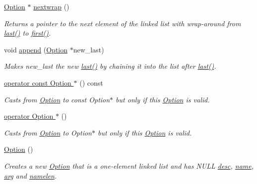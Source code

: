 \begin{DoxyCompactItemize}
\hyperlink{classoption_1_1Option}{Option} $\ast$ \hyperlink{classoption_1_1Option_ae8d8c058af3c781cb1d444998df48fef}{nextwrap} ()
\begin{DoxyCompactList}\small\item\em Returns a pointer to the next element of the linked list with wrap-\/around from \hyperlink{classoption_1_1Option_afe2aff68191e55b59c53fac3dbbcd7c3}{last()} to \hyperlink{classoption_1_1Option_abb4e13cd7c90999c8a6b1f871cece283}{first()}. \end{DoxyCompactList}\item 
void \hyperlink{classoption_1_1Option_a59030822a1ec4e667e6c288d7e5ec961}{append} (\hyperlink{classoption_1_1Option}{Option} $\ast$new\+\_\+last)
\begin{DoxyCompactList}\small\item\em Makes {\ttfamily new\+\_\+last} the new \hyperlink{classoption_1_1Option_afe2aff68191e55b59c53fac3dbbcd7c3}{last()} by chaining it into the list after \hyperlink{classoption_1_1Option_afe2aff68191e55b59c53fac3dbbcd7c3}{last()}. \end{DoxyCompactList}\item 
\hyperlink{classoption_1_1Option_a3c0504baaa809c622d59c2c09f83e25b}{operator const Option $\ast$} () const
\begin{DoxyCompactList}\small\item\em Casts from \hyperlink{classoption_1_1Option}{Option} to const Option$\ast$ but only if this \hyperlink{classoption_1_1Option}{Option} is valid. \end{DoxyCompactList}\item 
\hyperlink{classoption_1_1Option_ac5b9235d79208035d97e41fe17ba04d6}{operator Option $\ast$} ()
\begin{DoxyCompactList}\small\item\em Casts from \hyperlink{classoption_1_1Option}{Option} to Option$\ast$ but only if this \hyperlink{classoption_1_1Option}{Option} is valid. \end{DoxyCompactList}\item 
\mbox{\label{classoption_1_1Option_aa2810152fc23b14175b115d1a7d38095}} 
\hyperlink{classoption_1_1Option_aa2810152fc23b14175b115d1a7d38095}{Option} ()
\begin{DoxyCompactList}\small\item\em Creates a new \hyperlink{classoption_1_1Option}{Option} that is a one-\/element linked list and has N\+U\+LL \hyperlink{classoption_1_1Option_af8d664a7b5de1425008b1812a90a0c23}{desc}, \hyperlink{classoption_1_1Option_a02a76b4896abd22d0ba8514362261de9}{name}, \hyperlink{classoption_1_1Option_a402be734987458364b0f473acae36238}{arg} and \hyperlink{classoption_1_1Option_a3aa2957b19ad5815873441b415d56050}{namelen}. \end{DoxyCompactList}\item 

\end{DoxyCompactItemize}
